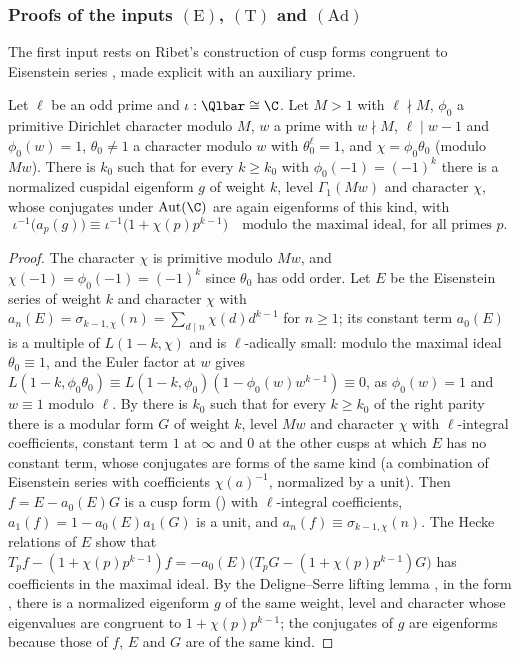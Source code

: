 \subsubsection{Proofs of the inputs \texorpdfstring{$(\mathrm{E})$, $(\mathrm{T})$ and $(\mathrm{Ad})$}{(E), (T) and (Ad)}}

The first input rests on Ribet's construction of cusp forms congruent to Eisenstein series \cite{Ribet1976}, made explicit with an
auxiliary prime.

\begin{lemma}\label{pf:eis:propEC}
Let $\ell$ be an odd prime and $\iota:\Qlbar\cong\C$. Let $M>1$ with $\ell\nmid M$, $\phi_0$ a primitive Dirichlet character modulo $M$, $w$ a
prime with $w\nmid M$, $\ell\mid w-1$ and $\phi_0(w)=1$, $\theta_0\ne1$ a character modulo $w$ with $\theta_0^\ell=1$, and $\chi=\phi_0\theta_0$ (modulo
$Mw$). There is $k_0$ such that for every $k\ge k_0$ with $\phi_0(-1)=(-1)^k$ there is a normalized cuspidal eigenform $g$ of weight $k$,
level $\Gamma_1(Mw)$ and character $\chi$, whose conjugates under $\mathrm{Aut}(\C)$ are again eigenforms of this kind, with
\[
 \iota^{-1}\bigl(a_p(g)\bigr)\equiv\iota^{-1}\bigl(1+\chi(p)p^{k-1}\bigr)\quad\text{modulo the maximal ideal, for all primes }p.
\]
\end{lemma}

\begin{proof}
The character $\chi$ is primitive modulo $Mw$, and $\chi(-1)=\phi_0(-1)=(-1)^k$ since $\theta_0$ has odd order. Let $E$ be the Eisenstein series
of weight $k$ and character $\chi$ with $a_n(E)=\sigma_{k-1,\chi}(n)=\sum_{d\mid n}\chi(d)d^{k-1}$ for $n\ge1$; its constant term $a_0(E)$ is a
multiple of $L(1-k,\chi)$ and is $\ell$-adically small: modulo the maximal ideal $\theta_0\equiv1$, and the Euler factor at $w$ gives
$L(1-k,\phi_0\theta_0)\equiv L(1-k,\phi_0)(1-\phi_0(w)w^{k-1})\equiv0$, as $\phi_0(w)=1$ and $w\equiv1$ modulo $\ell$. By
 there is $k_0$ such that for every $k\ge k_0$ of the right parity there is a modular form $G$
of weight $k$, level $Mw$ and character $\chi$ with $\ell$-integral coefficients, constant term $1$ at $\infty$ and $0$ at the other cusps at
which $E$ has no constant term, whose conjugates are forms of the same kind (a combination of Eisenstein series with coefficients
$\chi(a)^{-1}$, normalized by a unit). Then $f=E-a_0(E)G$ is a cusp form () with
$\ell$-integral coefficients, $a_1(f)=1-a_0(E)a_1(G)$ is a unit, and $a_n(f)\equiv\sigma_{k-1,\chi}(n)$. The Hecke relations of $E$ show that
$T_pf-(1+\chi(p)p^{k-1})f=-a_0(E)\bigl(T_pG-(1+\chi(p)p^{k-1})G\bigr)$ has coefficients in the maximal ideal. By the Deligne--Serre lifting lemma
\cite[Lemme~6.11]{DeligneSerre1974}, in the form , there is a normalized eigenform $g$ of the
same weight, level and character whose eigenvalues are congruent to $1+\chi(p)p^{k-1}$; the conjugates of $g$ are eigenforms because those
of $f$, $E$ and $G$ are of the same kind.
\end{proof}

